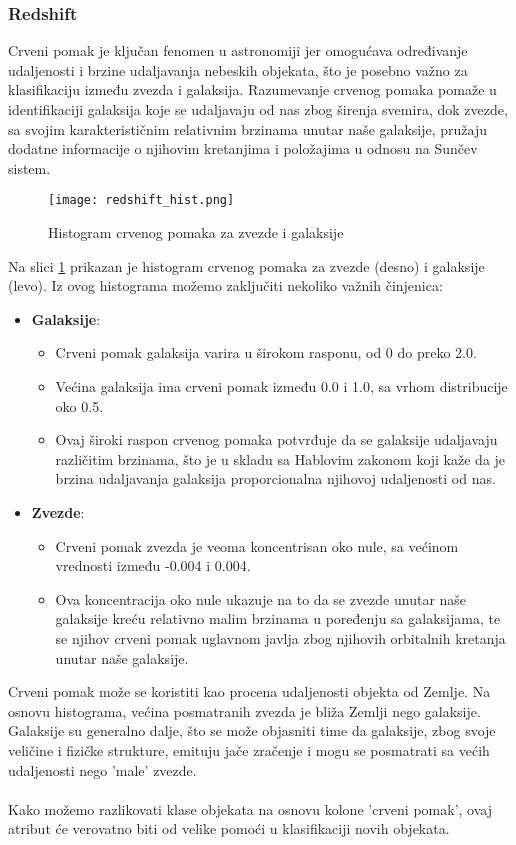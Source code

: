 \documentclass[a4paper,12pt]{article}
\begin{document}
\subsubsection{Redshift}
Crveni pomak je ključan fenomen u astronomiji jer omogućava određivanje udaljenosti i brzine udaljavanja nebeskih objekata, što je posebno važno za klasifikaciju između zvezda i galaksija. Razumevanje crvenog pomaka pomaže u identifikaciji galaksija koje se udaljavaju od nas zbog širenja svemira, dok zvezde, sa svojim karakterističnim relativnim brzinama unutar naše galaksije, pružaju dodatne informacije o njihovim kretanjima i položajima u odnosu na Sunčev sistem.

\clearpage

\begin{figure}[h!]
\centering
\texttt{[image: redshift\_hist.png]}
\caption{Histogram crvenog pomaka za zvezde i galaksije}
\label{fig:redshift_hist}
\end{figure}

Na slici \ref{fig:redshift_hist} prikazan je histogram crvenog pomaka za zvezde (desno) i galaksije (levo). Iz ovog histograma možemo zaključiti nekoliko važnih činjenica:

\begin{itemize}
    \item \textbf{Galaksije}: 
    \begin{itemize}
        \item Crveni pomak galaksija varira u širokom rasponu, od 0 do preko 2.0.
        \item Većina galaksija ima crveni pomak između 0.0 i 1.0, sa vrhom distribucije oko 0.5.
        \item Ovaj široki raspon crvenog pomaka potvrđuje da se galaksije udaljavaju različitim brzinama, što je u skladu sa Hablovim zakonom koji kaže da je brzina udaljavanja galaksija proporcionalna njihovoj udaljenosti od nas.
    \end{itemize}
    \item \textbf{Zvezde}: 
    \begin{itemize}
        \item Crveni pomak zvezda je veoma koncentrisan oko nule, sa većinom vrednosti između -0.004 i 0.004.
        \item Ova koncentracija oko nule ukazuje na to da se zvezde unutar naše galaksije kreću relativno malim brzinama u poređenju sa galaksijama, te se njihov crveni pomak uglavnom javlja zbog njihovih orbitalnih kretanja unutar naše galaksije.
    \end{itemize}
\end{itemize}
Crveni pomak može se koristiti kao procena udaljenosti objekta od Zemlje. Na osnovu histograma, većina posmatranih zvezda je bliža Zemlji nego galaksije. Galaksije su generalno dalje, što se može objasniti time da galaksije, zbog svoje veličine i fizičke strukture, emituju jače zračenje i mogu se posmatrati sa većih udaljenosti nego 'male' zvezde.
\\\\Kako možemo razlikovati klase objekata na osnovu kolone 'crveni pomak', ovaj atribut će verovatno biti od velike pomoći u klasifikaciji novih objekata.
\end{document}
